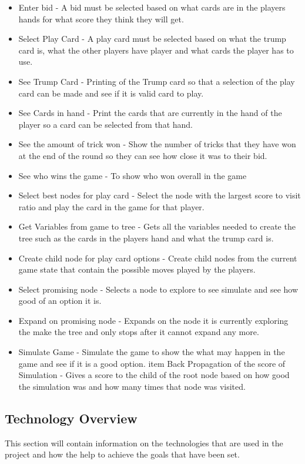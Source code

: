 \begin{itemize}
\item Enter bid - A bid must be selected based on what cards are in the players hands for what score they think they will get.
\item Select Play Card - A play card must be selected based on what the trump card is, what the other players have player and what cards the player has to use.
\item See Trump Card - Printing of the Trump card so that a selection of the play card can be made and see if it is valid card to play.
\item See Cards in hand - Print the cards that are currently in the hand of the player so a card can be selected from that hand.
\item See the amount of trick won - Show the number of tricks that they have won at the end of the round so they can see how close it was to their bid.
\item See who wins the game - To show who won overall in the game
\item Select best nodes for play card - Select the node with the largest score to visit ratio and play the card in the game for that player.
\item Get Variables from game to tree - Gets all the variables needed to create the tree such as the cards in the players hand and what the trump card is.
\item Create child node for play card options - Create child nodes from the current game state that contain the possible moves played by the players.
\item Select promising node - Selects a node to explore to see simulate and see how good of an option it is.
\item Expand on promising node - Expands on the node it is currently exploring the make the tree and only stops after it cannot expand any more.
\item Simulate Game - Simulate the game to show the what may happen in the game and see if it is a good option.
item Back Propagation of the score of Simulation - Gives a score to the child of the root node based on how good the simulation was and how many times that node was visited.
\end{itemize}
\subsection {Technology Overview}
This section will contain information on the technologies that are used in the project and how the help to achieve the goals that have been set.
